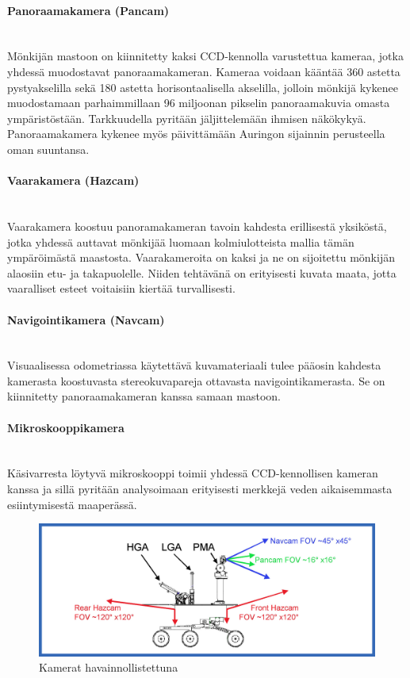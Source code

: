 \documentclass[finnish]{tktltiki2}
\theoremstyle{definition}
\theoremstyle{remark}
\begin{document}
\paragraph{Panoraamakamera (Pancam)}\mbox{} \\
Mönkijän mastoon on kiinnitetty kaksi CCD-kennolla varustettua kameraa, jotka yhdessä muodostavat panoraamakameran. Kameraa voidaan kääntää 360 astetta pystyakselilla sekä 180 astetta horisontaalisella akselilla, jolloin mönkijä kykenee muodostamaan parhaimmillaan 96 miljoonan pikselin panoraamakuvia omasta ympäristöstään. Tarkkuudella pyritään jäljittelemään ihmisen näkökykyä. Panoraamakamera kykenee myös päivittämään Auringon sijainnin perusteella oman suuntansa.\cite{cams}

\paragraph{Vaarakamera (Hazcam)}\mbox{} \\
Vaarakamera koostuu panoramakameran tavoin kahdesta erillisestä yksiköstä, jotka yhdessä auttavat mönkijää luomaan kolmiulotteista mallia tämän ympäröimästä maastosta. Vaarakameroita on kaksi ja ne on sijoitettu mönkijän alaosiin etu- ja takapuolelle. Niiden tehtävänä on erityisesti kuvata maata, jotta vaaralliset esteet voitaisiin kiertää turvallisesti.\cite{cams}

\paragraph{Navigointikamera (Navcam)}\mbox{} \\
Visuaalisessa odometriassa käytettävä kuvamateriaali tulee pääosin kahdesta kamerasta koostuvasta stereokuvapareja ottavasta navigointikamerasta. Se on kiinnitetty panoraamakameran kanssa samaan mastoon.\cite{cams}

\paragraph{Mikroskooppikamera}\mbox{} \\
Käsivarresta löytyvä mikroskooppi toimii yhdessä CCD-kennollisen kameran kanssa ja sillä pyritään analysoimaan erityisesti merkkejä veden aikaisemmasta esiintymisestä maaperässä.\cite{microscope}

\begin{figure}[H]
	\centering
		\includegraphics[width=1.0\textwidth]{cams}
	\caption{Kamerat havainnollistettuna \cite{cams}}
\end{figure}
\end{document}
